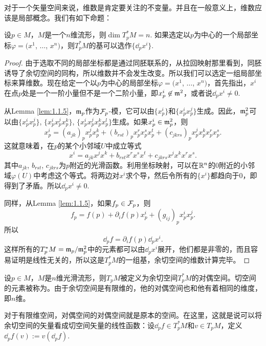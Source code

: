 对于一个矢量空间来说，维数是肯定要关注的不变量。并且在一般意义上，维数应该是局部概念。我们有如下命题：

\begin{pro}
设$p\in M$，$M$是一个$n$维流形，则$\dim T_p^*M=n$. 如果选定以$p$为中心的一个局部坐标$\varphi=(x^1$, $\dots$, $x^n)$，则$T_p^*M$的基可以选作$\{\dd_p x^i\}$.
\end{pro}

\begin{proof}
由于选取不同的局部坐标都是通过同胚联系的，从拉回映射那里看到，同胚诱导了余切空间的同构，所以维数并不会发生改变。所以我们可以选定一组局部坐标来算维数。现在给定一个以$p$为中心的局部坐标$\varphi=(x^1$, $\dots$, $x^n)$，首先指出，$x^i$在点$p$处是一个一阶小量但不是一个二阶小量，即$x^i_p\not\in \mathfrak{m}^2$，或者说$\dd_p x^i\neq 0$.

从Lemma \ref{lem:1.1.5}，$\mathfrak{m}_p$作为$\mathcal{F}_p$-模，它可以由$\{x^i_p\}$和$\{x^i_px^j_p\}$生成。因此，$\mathfrak{m}_p^2$可以由$\{x^i_px^j_{p}\}$, $\{x^i_px^j_{p}x^k_p\}$, $\{x^i_px^j_{p}x^k_px^l_p\}$生成。如果$x^i_p\in \mathfrak{m}_p^2$，则
\[
	x^i_p=(a_{jk})_px^j_px^k_p+(b_{rst})_p x^r_px^s_px^t_p+(c_{jkrs})_p x^j_px^k_px^r_px^s_p.
\]
这就意味着，在$p$的某个小邻域$U$中成立等式
\[
	x^i=a_{jk}x^j x^k +b_{rst} x^r x^s x^t +c_{jkrs} x^j x^k x^r x^s .
\]
其中$a_{jk}$, $b_{rst}$, $c_{jkrs}$为$p$附近的光滑函数。利用坐标映射，可以在$\mathbb{R}^n$的$0$附近的小邻域$\varphi(U)$中考虑这个等式。将两边对$x^i$求个导，然后令所有的$\{x^i\}$都趋向于$0$，即得到了矛盾。所以$\dd_p x^i\neq 0$.

同样，从Lemma \ref{lem:1.1.5}，如果$f_p\in \mathcal{F}_p$，则
\[
	f_p=f(p)+\partial_i f(p)x^i_p+(g_{ij})_p x^i_px^j_p.
\]
所以
\begin{equation}
\label{c1:e1}
	\dd_p f=\partial_i f(p)\dd_p x^i.
\end{equation}
这样所有的$T_p^*M=\mathfrak{m}_p/\mathfrak{m}_p^2$中的元素都可以由$\dd_px^i$展开，他们都是非零的，而且容易证明是线性无关的，所以这是$T_p^*M$的一组基，余切空间的维数计算完毕。
\end{proof}

\begin{para}[切空间]
设$p\in M$，$M$是$n$维光滑流形，则$T_pM$被定义为余切空间$T_p^*M$的对偶空间。切空间的元素被称为。由于余切空间是有限维的，他的对偶空间也和他有着相同的维度，即$n$维。
\end{para}

对于有限维空间，对偶空间的对偶空间就是原本的空间。在这里，这就是说可以将余切空间的矢量看成切空间矢量的线性函数：设$\dd_p f\in T_p^*M$和$v\in T_pM$，定义$\dd_p f(v):=v(\dd_p f)$.

